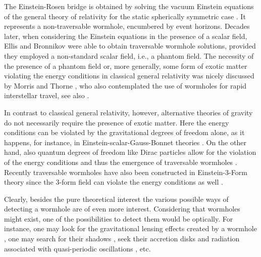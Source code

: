 \documentclass[a4paper,12pt]{article}
\begin{document}
The Einstein-Rosen bridge is obtained by solving the vacuum Einstein equations of the general theory of relativity for the static spherically symmetric case \cite{Einstein:1935tc}.
It represents a non-traversable wormhole, encumbered by event horizons.  
Decades later, when considering the Einstein equations in the presence of a scalar field, Ellis \cite{Ellis:1973yv,Ellis:1979bh} and Bronnikov \cite{Bronnikov:1973fh} were able to obtain traversable wormhole solutions, provided they employed a non-standard scalar field, i.e., a phantom field.
The necessity of the presence of a phantom field or, more generally, some form of exotic matter violating the energy conditions in classical general relativity was nicely discussed by Morris and Thorne \cite{Morris:1988cz}, who also contemplated the use of wormholes for rapid interstellar travel, see also \cite{Visser:1995cc,Alcubierre:2017pqm}.

In contrast to classical general relativity, however, alternative theories of gravity do not necessarily require the presence of exotic matter. 
Here the energy conditions can be violated by the gravitational degrees of freedom alone, as it happens, for instance, in Einstein-scalar-Gauss-Bonnet theories \cite{Kanti:2011jz,Kanti:2011yv,Antoniou:2019awm}.
On the other hand, also quantum degrees of freedom like Dirac particles allow for the violation of the energy conditions and thus the emergence of traversable wormholes \cite{Blazquez-Salcedo:2020czn,Blazquez-Salcedo:2021udn,Blazquez-Salcedo:2019uqq,Konoplya:2021hsm}. Recently traversable wormholes have also been constructed in Einstein-3-Form theory {since} the 3-form field can violate the energy conditions {as well \cite{Barros:2018lca,Bouhmadi-Lopez:2021zwt}}.

Clearly, besides the pure theoretical interest %
the various possible ways of detecting a wormhole are of even more interest. 
Considering that wormholes might exist, one of the possibilities to detect them would be optically. 
For instance, one may look for the gravitational lensing effects created by a wormhole 
\cite{Cramer:1994qj,Safonova:2001vz,Perlick:2003vg,Nandi:2006ds,Abe:2010ap,Toki:2011zu,Nakajima:2012pu,Tsukamoto:2012xs,Kuhfittig:2013hva,Bambi:2013nla,Takahashi:2013jqa,Tsukamoto:2016zdu},
one may search for their shadows
\cite{Bambi:2013nla,Nedkova:2013msa,Ohgami:2015nra,Shaikh:2018kfv,Gyulchev:2018fmd,Guerrero:2022qkh,Bouhmadi-Lopez:2021zwt},
seek their accretion disks and radiation associated with quasi-periodic oscillations
\cite{Harko:2008vy,Harko:2009xf,Bambi:2013jda,Zhou:2016koy,Lamy:2018zvj,Deligianni:2021ecz,Deligianni:2021hwt}, {etc.} %
%
\end{document}
